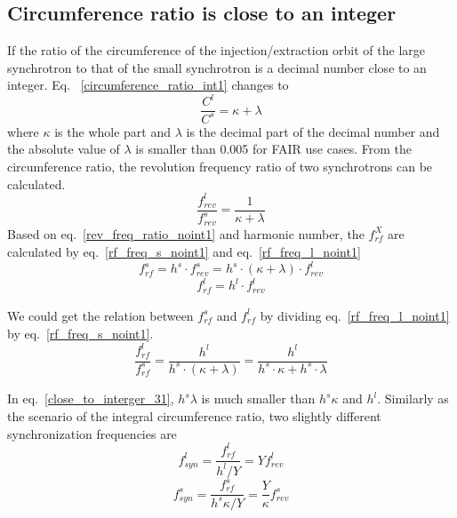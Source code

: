 \subsection{Circumference ratio is close to an integer}
\label{sec:cir_close_an_int}
If the ratio of the circumference of the injection/extraction orbit of the large synchrotron to that of the small synchrotron is a decimal number close to an integer. Eq. ~\ref{circumference_ratio_int1} changes to 
\begin{equation}
\frac{C^l}{C^s}= \kappa + \lambda \label{circumference_ratio_noint0}
\end{equation}
where $\kappa$ is the whole part and $\lambda$ is the decimal part of the decimal number and the absolute value of $\lambda$ is smaller than 0.005 for FAIR use cases. From the circumference ratio, the revolution frequency ratio of two synchrotrons can be calculated.
\begin{equation}
\frac{f_{\mathit{rev}}^{l}}{f_{\mathit{rev}}^{s}}=\frac{1}{ \kappa+ \lambda} \label{rev_freq_ratio_noint1}
\end{equation}
Based on eq.~\ref{rev_freq_ratio_noint1} and harmonic number, the $f_{\mathit{rf}}^{X}$ are calculated by eq.~\ref{rf_freq_s_noint1} and eq.~\ref{rf_freq_l_noint1}
\begin{equation} 
f_{\mathit{rf}}^{s}= h^s \cdot f_{\mathit{rev}}^{s}=h^s \cdot ( \kappa+ \lambda) \cdot f_{\mathit{rev}}^{l} \label{rf_freq_s_noint1}
\end{equation}
\begin{equation} 
f_{\mathit{rf}}^{l}= h^l \cdot f_{\mathit{rev}}^{l} \label{rf_freq_l_noint1}
\end{equation}

We could get the relation between $f_{\mathit{rf}}^{s}$ and $f_{\mathit{rf}}^{l}$ by dividing eq.~\ref{rf_freq_l_noint1} by eq.~\ref{rf_freq_s_noint1}.
\begin{equation} 
\frac{f_{\mathit{rf}}^{l}}{f_{\mathit{rf}}^{s}}=\frac{h^l}{h^s \cdot ( \kappa+ \lambda)}=\frac{h^l}{h^s \cdot  \kappa+ h^s \cdot \lambda}\label{close_to_interger_31}
\end{equation}

In eq.~\ref{close_to_interger_31}, $h^s\lambda $ is much smaller than $h^s\kappa$ and $h^l$. Similarly as the scenario of the integral circumference ratio, two slightly different synchronization frequencies are 
\begin{equation}
f_{\mathit{syn}}^{l}=\frac{f_{\mathit{rf}}^{l}}{h^{l}/Y}=Yf_{\mathit{rev}}^{l} \label{synch_freq11}
\end{equation}
\begin{equation}
f_{\mathit{syn}}^{s}=\frac{f_{\mathit{rf}}^{s}}{h^{s}\kappa/Y}=\frac{Y}{\kappa}f_{\mathit{rev}}^{s} \label{synch_freq22}
\end{equation}


